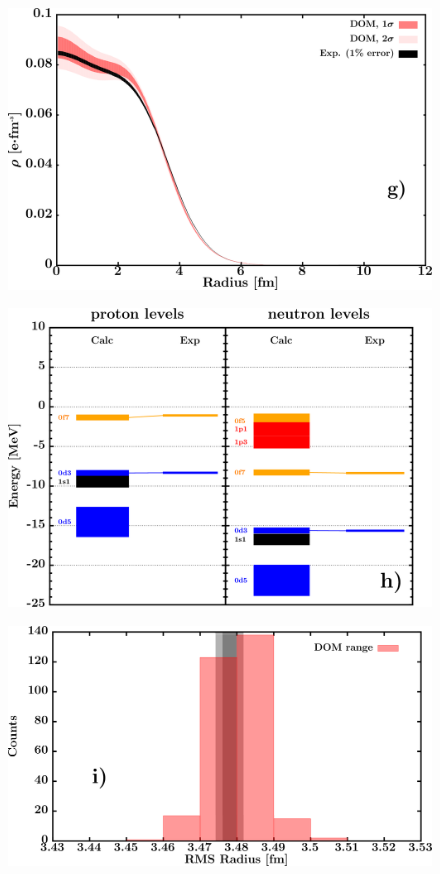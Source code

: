\documentclass[twocolumn,secnumarabic,amssymb, nobibnotes, aps, prl,
superscriptaddress, nobalancelastpage]{revtex4}
\begin{document}
\begin{figure}[!htb]
\begin{minipage}{0.4\linewidth}
        \includegraphics[width=\linewidth]{figures/ca40_chargeDensity.png}
        \label{DOM_ca40_chargeDensity}
    \end{minipage}
    \begin{minipage}{0.35\linewidth}
        \centering
        \includegraphics[width=\linewidth]{figures/ca40_SPLevels.png}
        \label{DOM_ca40_SPLevels}
    \end{minipage}
    \begin{minipage}{0.4\linewidth}
        \centering
        \includegraphics[width=\linewidth]{figures/ca40_RMSRadius.png}

\end{minipage}
\end{figure}
\end{document}
